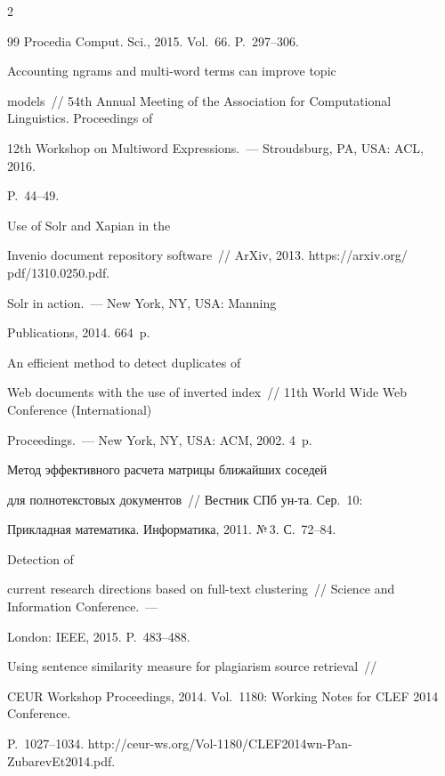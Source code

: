 \begin{multicols}{2}
{{\begin{thebibliography}{99}
Procedia Comput. Sci., 2015. Vol.~66. P.~297--306.


 Accounting ngrams and multi-word terms can improve topic 

models~// 54th Annual Meeting of the Association for Computational Linguistics. Proceedings of 

12th Workshop on Multiword Expressions.~--- Stroudsburg, PA, USA: ACL, 2016. 

P.~44--49.




 Use of Solr and Xapian in the 

Invenio document repository software~// ArXiv, 2013. {\sf https://arxiv.org/ pdf/1310.0250.pdf}. 




 Solr in action.~--- New York, NY, USA: Manning 

Publications, 2014. 664~p.




 An efficient method to detect duplicates of 

Web documents with the use of inverted index~// 11th World Wide Web Conference (International) 

Proceedings.~--- New York, NY, USA: ACM, 2002. 4~p.


 Метод эффективного расчета матрицы ближайших соседей 

для полнотекстовых документов~// Вестник СПб ун-та. Сер.~10: 

Прикладная математика. Информатика, 2011. №\,3. С.~72--84.


 Detection of 

current research directions based on full-text clustering~// Science and Information Conference.~--- 

London: IEEE, 2015. P.~483--488.


 Using sentence similarity measure for plagiarism source retrieval~// 

CEUR Workshop Proceedings, 2014. Vol.~1180: Working Notes for CLEF 2014 Conference. 

P.~1027--1034. {\sf http://ceur-ws.org/Vol-1180/CLEF2014wn-Pan-ZubarevEt2014.pdf}.

 \end{thebibliography}



 }

 }



\end{multicols}
